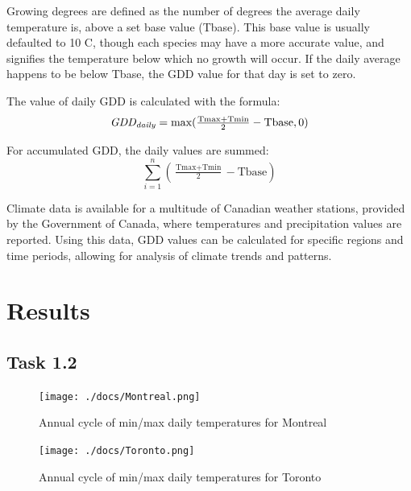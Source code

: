 \documentclass[12pt]{article}
\begin{document}
Growing degrees are defined as the number of degrees the average daily 
temperature is, above a set base value (Tbase). This base value is 
usually defaulted to 10 \degree C, though each species may have a more 
accurate value, and signifies the temperature below which no growth 
will occur. If the daily average happens to be below Tbase, the GDD 
value for that day is set to zero. \\

\bigskip
\par

The value of daily GDD is calculated with the formula:
$$
\textit{GDD\textsubscript{daily}} =  \text{max}( \tfrac{\text{Tmax}+\text{Tmin}}{2}-\text{Tbase}, 0)
$$

\bigskip
\bigskip

For accumulated GDD, the daily values are summed:
$$
\sum_{i=1}^n ( \tfrac{\text{Tmax}+\text{Tmin}}{2}-\text{Tbase})
$$

\bigskip

\par
Climate data is available for a multitude of Canadian weather stations, provided
by the Government of Canada, where temperatures and precipitation values are reported. 
Using this data, GDD values can be calculated for 
specific regions and time periods, allowing for analysis of climate trends and patterns. 



\pagebreak

\section{Results}\label{data analysis}
\subsection{Task 1.2}

\begin{figure}[!htbp]
\centering
\texttt{[image: ./docs/Montreal.png]} 
\caption{\scriptsize Annual cycle of min/max daily temperatures for Montreal}
\label{minmax_mont}		  
\end{figure}

\begin{figure}[!htbp]
\centering
\texttt{[image: ./docs/Toronto.png]} 
\caption{\scriptsize Annual cycle of min/max daily temperatures for Toronto}
\label{minmax_tor}		  
\end{figure}
\end{document}
